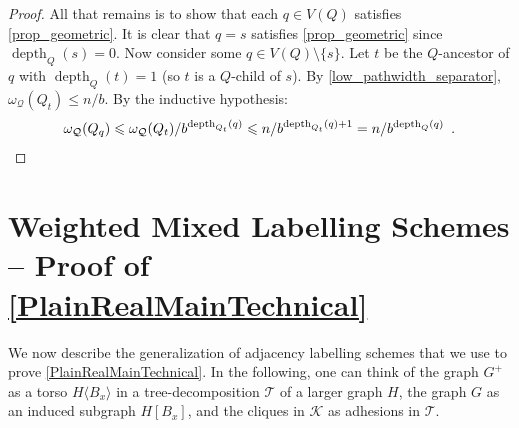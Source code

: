 \documentclass{patmorin}
\renewcommand{\le}{\leqslant}
\newcommand{\torso}[2]{{#1}\langle{#2}\rangle}
\DeclareMathOperator{\depth}{depth}
\newcommand{\calK}{\mathcal{K}}
\newcommand{\calQ}{\mathcal{Q}}
\newcommand{\calT}{\mathcal{T}}
\begin{document}
\begin{proof}
    
    
    

    All that remains is to show that each $q\in V(Q)$ satisfies \ref{prop_geometric}.  It is clear that $q=s$ satisfies \ref{prop_geometric} since $\depth_Q(s)=0$.  Now consider some $q\in V(Q)\setminus\{s\}$.  Let $t$ be the $Q$-ancestor of $q$ with $\depth_{Q}(t)=1$ (so $t$ is a $Q$-child of $s$). By \cref{low_pathwidth_separator}, $\omega_{\calQ}(Q_{t})\le n/b$. By the inductive hypothesis:
    \[
       \omega_{\calQ}(Q_{q})
       \le  \omega_{\calQ}(Q_{t})/b^{\depth_{Q_{t}}(q)}
       \le n/b^{\depth_{Q_{t}}(q)+1} = n/b^{\depth_{Q}(q)} \enspace . \qedhere
    \]
  \end{proof}



  \section{Weighted Mixed Labelling Schemes -- Proof of \cref{PlainRealMainTechnical}}
  \label{weighted_mixed_section}

We now describe the generalization of adjacency labelling schemes that we use to prove \cref{PlainRealMainTechnical}.  In the following, one can think of the graph $G^+$ as a torso $\torso{H}{B_x}$ in a tree-decomposition $\calT$ of a larger graph $H$, the graph $G$ as an induced subgraph $H[B_x]$, and the cliques in $\calK$ as adhesions in $\calT$.
\end{document}
